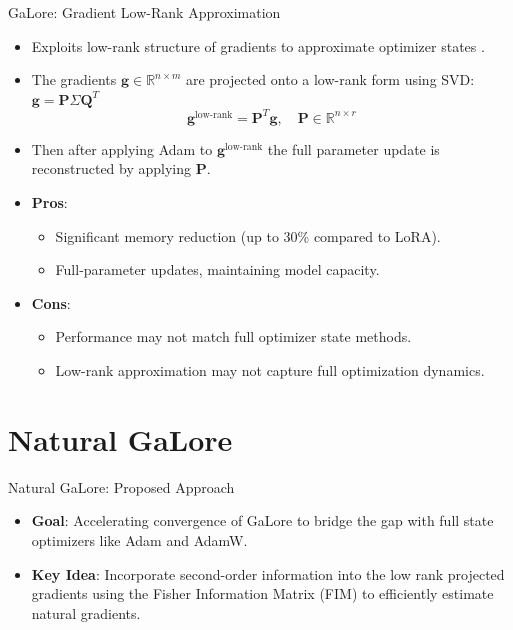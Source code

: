 \documentclass{beamer}
\begin{document}
\begin{frame}{GaLore: Gradient Low-Rank Approximation}
    \begin{itemize}
        \item Exploits low-rank structure of gradients to approximate optimizer states \citep{zhao2024galore}.
        \item The gradients \(\mathbf{g} \in \mathbb{R}^{n \times m}\) are projected onto a low-rank form using SVD: \(\mathbf{g} = \mathbf{P} \Sigma \mathbf{Q}^{T}\)
        \begin{equation}
            \mathbf{g}^{\text{low-rank}} = \mathbf{P}^{T} \mathbf{g}, \quad \mathbf{P} \in \mathbb{R}^{n \times r}
        \end{equation}
        \item Then after applying Adam to \(\mathbf{g}^{\text{low-rank}}\) the full parameter update is reconstructed by applying \(\mathbf{P}\).
        \item \textbf{Pros}:
            \begin{itemize}
                \item Significant memory reduction (up to 30\% compared to LoRA).
                \item Full-parameter updates, maintaining model capacity.
            \end{itemize}
        \item \textbf{Cons}:
            \begin{itemize}
                \item Performance may not match full optimizer state methods.
                \item Low-rank approximation may not capture full optimization dynamics.
            \end{itemize}
    \end{itemize}
\end{frame}

\section{Natural GaLore}

\begin{frame}{Natural GaLore: Proposed Approach}
    \begin{itemize}
        \item \textbf{Goal}: Accelerating convergence of GaLore to bridge the gap with full state optimizers like Adam and AdamW.
        \item \textbf{Key Idea}: Incorporate second-order information into the low rank projected gradients using the Fisher Information Matrix (FIM) to efficiently estimate natural gradients.
    \end{itemize}
\end{frame}
\end{document}
